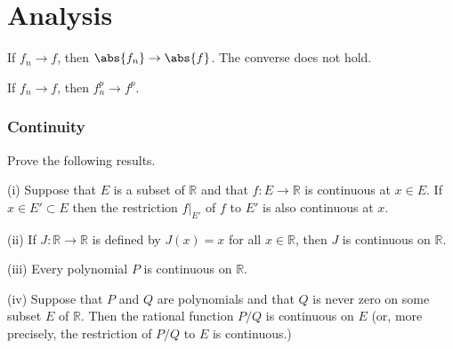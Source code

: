 



\chapter{Analysis}

\ben
\item [(i)] If $f_n \to f$, then $\abs{f_n} \to \abs{f}$. The converse does not hold.
\item [(ii)] If $f_n \to f$, then $f_n^p \to f^p$.
\een













\subsection{Continuity}

\begin{problem}
Prove the following results.

(i) Suppose that $E$ is a subset of $\mathbb{R}$ and that $f : E \rightarrow \mathbb{R}$ is continuous at $x \in E$. If $x \in  E' \subset E$ then the restriction $f|_{E'}$ of $f$ to $E'$ is also continuous at $x$.

(ii) If $J : \mathbb{R} \rightarrow \mathbb{R}$ is defined by $J(x) = x$ for all $x \in \mathbb{R}$, then $J$ is continuous on $\mathbb{R}$.

(iii) Every polynomial $P$ is continuous on $\mathbb{R}$.

(iv) Suppose that $P$ and $Q$ are polynomials and that $Q$ is never zero on some subset $E$ of $\mathbb{R}$. Then the rational function $P/Q$ is continuous on $E$ (or, more precisely, the restriction of $P/Q$ to $E$ is continuous.)
\end{problem}


